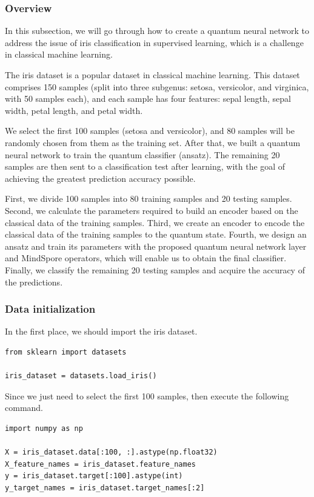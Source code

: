 \subsubsection{Overview}
In this subsection, we will go through how to create a quantum neural network to address the issue of iris classification in supervised learning, which is a challenge in classical machine learning.

The iris dataset is a popular dataset in classical machine learning. This dataset comprises 150 samples (split into three subgenus: setosa, versicolor, and virginica, with 50 samples each), and each sample has four features: sepal length, sepal width, petal length, and petal width.

We select the first 100 samples (setosa and versicolor), and 80 samples will be randomly chosen from them as the training set. After that, we built a quantum neural network to train the quantum classifier (ansatz). The remaining 20 samples are then sent to a classification test after learning, with the goal of achieving the greatest prediction accuracy possible.

First, we divide 100 samples into 80 training samples and 20 testing samples. Second, we calculate the parameters required to build an encoder based on the classical data of the training samples. Third, we create an encoder to encode the classical data of the training samples to the quantum state. Fourth, we design an ansatz and train its parameters with the proposed quantum neural network layer and MindSpore operators, which  will enable us to obtain the final classifier. Finally, we classify the remaining 20 testing samples and acquire the accuracy of the predictions.

\subsubsection{Data initialization}
In the first place, we should import the iris dataset. 

\begin{lstlisting}       
from sklearn import datasets                             

iris_dataset = datasets.load_iris()
\end{lstlisting}

Since we just need to select the first 100 samples, then execute the following command.

\begin{lstlisting}
import numpy as np     

X = iris_dataset.data[:100, :].astype(np.float32)
X_feature_names = iris_dataset.feature_names
y = iris_dataset.target[:100].astype(int)
y_target_names = iris_dataset.target_names[:2] 
\end{lstlisting}

